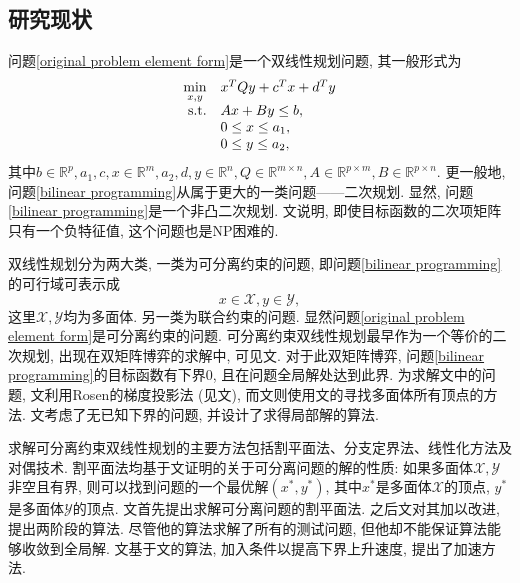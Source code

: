\subsection{研究现状}
问题\eqref{original problem element form}是一个双线性规划问题, 其一般形式为
\begin{equation}
	\begin{array}{rl}
		\min\limits_{x,y} & x^TQy+c^Tx+d^Ty\\
		\mathrm{s.t.} & Ax+By\le b,\\
		 & 0\le x\le a_1,\\
		 & 0\le y\le a_2,
	\end{array}
	\label{bilinear programming}
\end{equation}
其中$b\in\mathbb{R}^p,a_1,c,x\in\mathbb{R}^{m},a_2,d,y\in\mathbb{R}^{n},Q\in\mathbb{R}^{m\times n},A\in\mathbb{R}^{p\times m},B\in\mathbb{R}^{p\times n}$. 更一般地, 问题\eqref{bilinear programming}从属于更大的一类问题——二次规划. 显然, 问题\eqref{bilinear programming}是一个非凸二次规划. 文\cite{Pardalos1991Quadratic}说明, 即使目标函数的二次项矩阵只有一个负特征值, 这个问题也是NP困难的. 
\par 双线性规划分为两大类, 一类为可分离约束的问题, 即问题\eqref{bilinear programming}的可行域可表示成
$$x\in \mathcal{X},y\in \mathcal{Y},$$这里$\mathcal{X},\mathcal{Y}$均为多面体. 另一类为联合约束的问题. 显然问题\eqref{original problem element form}是可分离约束的问题. 可分离约束双线性规划最早作为一个等价的二次规划, 出现在双矩阵博弈的求解中, 可见文\cite{Mills1960Equilibrium}. 对于此双矩阵博弈, 问题\eqref{bilinear programming}的目标函数有下界0, 且在问题全局解处达到此界. 为求解文\cite{Mills1960Equilibrium}中的问题, 文\cite{O1964Equilibrium}利用Rosen的梯度投影法 (见文\cite{Rosen1960The}), 而文\cite{MANGASARIAN1964348}则使用文\cite{Balinski1961An}的寻找多面体所有顶点的方法. 文\cite{Altman1968bilinear}考虑了无已知下界的问题, 并设计了求得局部解的算法.
\par 求解可分离约束双线性规划的主要方法包括割平面法、分支定界法、线性化方法及对偶技术. 割平面法均基于文\cite{Konno1976ACP}证明的关于可分离问题的解的性质: 如果多面体$\mathcal{X},\mathcal{Y}$非空且有界, 则可以找到问题的一个最优解$(x^*,y^*)$, 其中$x^*$是多面体$\mathcal{X}$的顶点, $y^*$是多面体$\mathcal{Y}$的顶点. 文\cite{Ritter1966}首先提出求解可分离问题的割平面法. 之后文\cite{Konno1976ACP}对其加以改进, 提出两阶段的算法. 尽管他的算法求解了所有的测试问题, 但他却不能保证算法能够收敛到全局解. 文\cite{Ding2007}基于文\cite{Konno1976ACP}的算法, 加入条件以提高下界上升速度, 提出了加速方法. 
